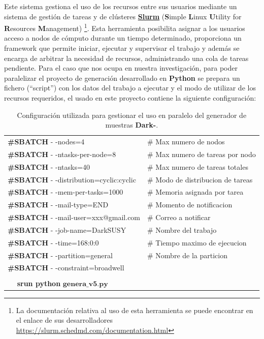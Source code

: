 Este sistema gestiona el uso de los recursos entre sus usuarios mediante un sistema de gestión de tareas y de clús\-te\-res
\href{https://es.wikipedia.org/wiki/Simple\_Linux\_Utility\_for\_Resource\_Management}{\textbf{Slurm}} (\textbf{S}imple \-\textbf{L}inux \-\textbf{U}tility for \textbf{R}e\-sour\-ces \-\textbf{M}ana\-ge\-ment)
\footnote{La documentación relativa al uso de esta herramienta se puede encontrar en el enlace de sus desarrolladores \href{https://slurm.schedmd.com/documentation.html}{https://slurm.schedmd.com/documentation.html}}. 
Esta herramienta posibilita asignar a los usuarios acceso a nodos de cómputo durante un tiempo determinado, proporciona un framework que permite iniciar, ejecutar y supervisar el trabajo y además se encarga de arbitrar la necesidad de recursos, administrando una cola de tareas pendiente. Para el caso que nos ocupa en nuestra investigación, para poder paralelizar el proyecto de generación desarrollado en \textbf{Python} se prepara un fichero (``script'') con los datos del trabajo a ejecutar y el modo de utilizar de los recursos requeridos, el usado en este proyecto contiene la siguiente configuración:\\[.2cm] %

\begin{table}[!ht]
\begin{center}
\small
\begin{tabular}{|ll|}
\toprule
\textbf{\#SBATCH} - -nodes=4                    &\# Max numero de nodos\\
\textbf{\#SBATCH} - -ntasks-per-node=8          &\# Max numero de tareas por nodo\\
\textbf{\#SBATCH} - -ntasks=40                  &\# Max numero de tareas totales\\
\textbf{\#SBATCH} - -distribution=cyclic:cyclic &\# Modo de distribucion de tareas\\
\textbf{\#SBATCH} - -mem-per-tasks=1000         &\# Memoria asignada por tarea\\
\textbf{\#SBATCH} - -mail-type=END              &\# Momento de notificacion\\
\textbf{\#SBATCH} - -mail-user=xxx@gmail.com    &\# Correo a notificar\\
\textbf{\#SBATCH} - -job-name=DarkSUSY          &\# Nombre del trabajo\\
\textbf{\#SBATCH} - -time=168:0:0               &\# Tiempo maximo de ejecucion\\
\textbf{\#SBATCH} - -partition=general          &\# Nombre de la particion\\
\textbf{\#SBATCH} - -constraint=broadwell       & \\
& \\[-.3cm]
~~ \textbf{srun python} $\mathbf{genera\_v5.py}$ & \\
\bottomrule 
\end{tabular}
\caption{Configuración utilizada para gestionar el uso en paralelo del generador de muestras \textbf{Dark-}\SUSY.}
\label{table_slurm}
\end{center}
\end{table}



